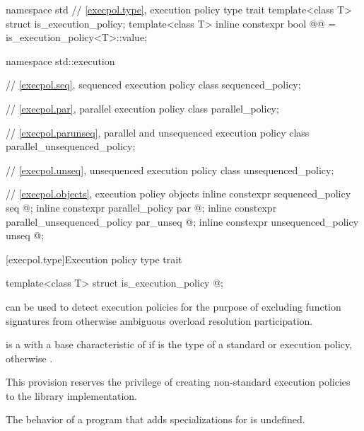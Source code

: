 %
\begin{codeblock}
namespace std {
  // \ref{execpol.type}, execution policy type trait
  template<class T> struct is_execution_policy;
  template<class T> inline constexpr bool @@ = is_execution_policy<T>::value;
}

namespace std::execution {
  // \ref{execpol.seq}, sequenced execution policy
  class sequenced_policy;

  // \ref{execpol.par}, parallel execution policy
  class parallel_policy;

  // \ref{execpol.parunseq}, parallel and unsequenced execution policy
  class parallel_unsequenced_policy;

  // \ref{execpol.unseq}, unsequenced execution policy
  class unsequenced_policy;

  // \ref{execpol.objects}, execution policy objects
  inline constexpr sequenced_policy            seq{ @\unspec@ };
  inline constexpr parallel_policy             par{ @\unspec@ };
  inline constexpr parallel_unsequenced_policy par_unseq{ @\unspec@ };
  inline constexpr unsequenced_policy          unseq{ @\unspec@ };
}
\end{codeblock}

[execpol.type]{Execution policy type trait}

%
\begin{itemdecl}
template<class T> struct is_execution_policy { @\seebelow@ };
\end{itemdecl}

\begin{itemdescr}
\pnum
{} can be used to detect execution policies for the
purpose of excluding function signatures from otherwise ambiguous overload
resolution participation.

\pnum
{} is a  with a
base characteristic of  if  is the type of a standard
or 
execution policy, otherwise .

\begin{note}
This provision reserves the privilege of creating non-standard execution
policies to the library implementation.
\end{note}

\pnum
The behavior of a program that adds specializations for
 is undefined.
\end{itemdescr}

